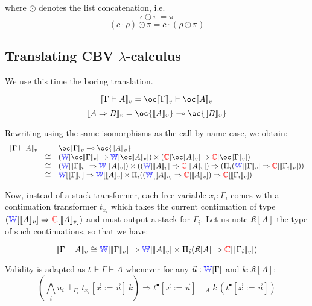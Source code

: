 \documentclass[a4paper]{article}
\newcommand{\interp}[1]{[\![ #1 ]\!]}
\newcommand{\wproof}[1]{{\color{blue}\mathbb{W}}[#1]}
\newcommand{\cproof}[1]{{\color{red}\mathbb{C}}[#1]}
\begin{document}
\noindent where $\odot$ denotes the list concatenation, i.e.
$$\epsilon \odot \pi = \pi$$
$$(c \cdot \rho)\odot \pi = c \cdot (\rho \odot \pi)$$

\subsection{Translating CBV $\lambda$-calculus}

We use this time the boring translation.

$$\interp{\Gamma \vdash A}_v = \oc\interp{\Gamma}_v \vdash \oc\interp{A}_v$$
$$\interp{A \Rightarrow B}_v = \oc{\interp{A}_v} \multimap \oc{\interp{B}_v}$$

Rewriting using the same isomorphisms as the call-by-name case, we obtain:
$$\begin{array}{lcl}
  \interp{\Gamma\vdash A}_v
  &=& {\oc\interp{\Gamma}_v} \multimap \oc{\interp{A}_v}\\

  &\cong& (\wproof{\oc\interp{\Gamma}_v} \Rightarrow \wproof{\oc\interp{A}_v})
  \times (\cproof{\oc\interp{A}_v} \Rightarrow \cproof{\oc\interp{\Gamma}_v})\\

  &\cong& (\wproof{\interp{\Gamma}_v} \Rightarrow \wproof{\interp{A}_v})
  \times ((\wproof{\interp{A}_v} \Rightarrow \cproof{\interp{A}_v}) \Rightarrow
  (\Pi_i (\wproof{\interp{\Gamma}_v}
    \Rightarrow \cproof{\interp{\Gamma_i}_v}))\\

  &\cong& \wproof{\interp{\Gamma}_v} \Rightarrow
    \wproof{\interp{A}_v} \times \Pi_i
    ((\wproof{\interp{A}_v} \Rightarrow \cproof{\interp{A}_v})
      \Rightarrow \cproof{\interp{\Gamma_i}_v})
\end{array}$$

\newcommand{\kont}[1]{\mathfrak{K}[#1]}

Now, instead of a stack transformer, each free variable $x_i : \Gamma_i$ comes
with a continuation transformer $t_{x_i}$ which takes the current continuation 
of type $(\wproof{\interp{A}_v} \Rightarrow \cproof{\interp{A}_v})$ and must 
output a stack for $\Gamma_i$. Let us note $\kont{A}$ the type of such
continuations, so that we have:

$$
  \interp{\Gamma\vdash A}_v \cong \wproof{\interp{\Gamma}_v} \Rightarrow
    \wproof{\interp{A}_v} \times \Pi_i
    (\kont{A} \Rightarrow \cproof{\interp{\Gamma_i}_v})\\
$$

Validity is adapted as $t \Vdash \Gamma \vdash A$ whenever for any $\vec{u} : 
\wproof{\Gamma}$ and $k : \kont{A}$:
$$
  \left(\bigwedge_i u_i \perp_{\Gamma_i} t_{x_i}[\vec{x} := \vec{u}]\, k\right)
    \Rightarrow t^\bullet[\vec{x} := \vec{u}] \perp_A k\,
      (t^\bullet [\vec{x} := \vec{u}]) $$
\end{document}
